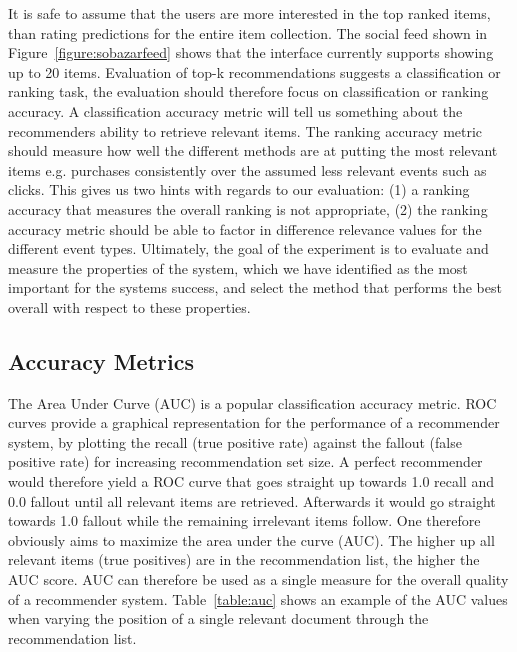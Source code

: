 It is safe to assume that the users are more interested in the top ranked items, than rating
predictions for the entire item collection. The social feed shown in Figure~\ref{figure:sobazarfeed}
shows that the interface currently supports showing up to 20 items.
Evaluation of top-k recommendations suggests a classification or ranking task, the evaluation
should therefore focus on classification or ranking accuracy. A classification accuracy metric
will tell us something about the recommenders ability to retrieve relevant items. The ranking
accuracy metric should measure how well the different methods are at putting the most relevant items
e.g. purchases consistently over the assumed less relevant events such as clicks. This gives us
two hints with regards to our evaluation: (1) a ranking accuracy that measures the overall ranking
is not appropriate, (2) the ranking accuracy metric should be able to factor in difference relevance
values for the different event types. Ultimately, the goal of the experiment is to evaluate and measure the properties
of the system, which we have identified as the most important for the systems success,
and select the method that performs the best overall with respect to these properties.

\subsection{Accuracy Metrics}

The Area Under Curve (AUC) is a popular classification accuracy metric. ROC curves provide a graphical
representation for the performance of a recommender system, by plotting the recall (true positive rate)
against the fallout (false positive rate) for increasing recommendation set size. A perfect recommender
would therefore yield a ROC curve that goes straight up towards 1.0 recall and 0.0 fallout until all
relevant items are retrieved. Afterwards it would go straight towards 1.0 fallout while the remaining
irrelevant items follow. One therefore obviously aims to maximize the area under the curve (AUC). The higher
up all relevant items (true positives) are in the recommendation list, the higher the AUC score.
AUC can therefore be used as a single measure for the overall quality of a recommender system. Table~\ref{table:auc}
shows an example of the AUC values when varying the position of a single relevant document through the
recommendation list.

